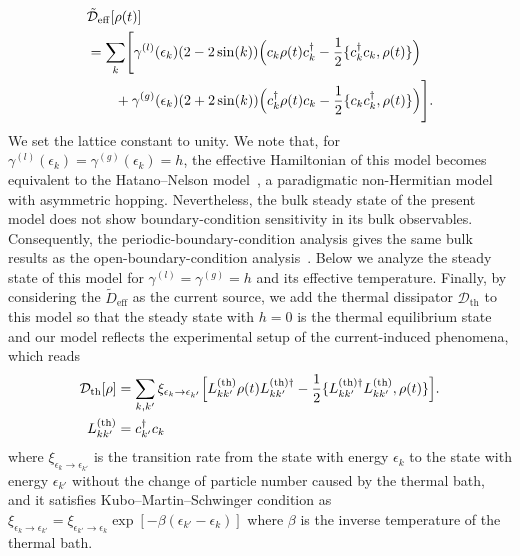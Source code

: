 \documentclass[a4paper, amsfonts, amssymb, amsmath, reprint, showkeys, nofootinbib, twoside,superscriptaddress, prl]{revtex4-2}
\newcommand{\m}[1]{\mathcal{#1}}
\newcommand{\mr}[1]{\mathrm{#1}}
\newcommand{\epk}{\epsilon_k}
\newcommand{\epkp}{\epsilon_{k'}}
\begin{document}
\begin{align}
&\tilde{\m{D}}_{\mr{eff}}[\rho(t)] \nonumber\\
&=\sum_k \Biggl[\gamma^{(l)}(\epsilon_k) (2-2\sin(k))\Bigl(c_k\rho(t)c_k^{\dagger} - \frac{1}{2}\{c_k^{\dagger}c_k, \rho(t)\}\Bigr)\nonumber\\
&\quad\quad +\gamma^{(g)}(\epsilon_k) (2+2\sin(k))\Bigl(c_k^{\dagger}\rho(t)c_k - \frac{1}{2}\{c_kc_k^{\dagger}, \rho(t)\}\Bigr)\Biggr].\label{jump_current2}
\end{align}
We set the lattice constant to unity. We note that, for $\gamma^{(l)}(\epsilon_k)=\gamma^{(g)}(\epsilon_k)=h$, the effective Hamiltonian of this model becomes equivalent to the Hatano--Nelson model~\cite{Hatano1998-jg,Hatano1996-sw}, a paradigmatic non-Hermitian model with asymmetric hopping. Nevertheless, the bulk steady state of the present model does not show boundary-condition sensitivity in its bulk observables. Consequently, the periodic-boundary-condition analysis gives the same bulk results as the open-boundary-condition analysis~\cite{Supple}.
Below we analyze the steady state of this model for $\gamma^{(l)} = \gamma^{(g)} = h$ and its effective temperature. 
Finally, by considering the $\tilde{D}_{\mr{eff}}$ as the current source, we add the thermal dissipator $\m{D}_{\mr{th}}$ to this model so that the steady state with $h=0$ is the thermal equilibrium state and our model reflects the experimental setup of the current-induced phenomena, which reads
\begin{align}
\m{D}_{\mr{th}}[\rho]& = \sum_{k, k'} \xi_{\epk\rightarrow\epkp}\Bigl[L^{(\mr{th})}_{kk'}\rho(t)L^{(\mr{th})\dagger}_{kk'} - \frac{1}{2}\{L^{(\mr{th})\dagger}_{kk'}L^{(\mr{th})}_{kk'}, \rho(t)\}\Bigr].\\
L^{(\mr{th})}_{kk'}& = c_{k'}^{\dagger} c_{k}\label{thermal_jump}
\end{align}
where $\xi_{\epk\rightarrow\epkp}$ is the transition rate from the state with energy $\epk$ to the state with energy $\epkp$ without the change of particle number caused by the thermal bath, and it satisfies Kubo--Martin--Schwinger condition as $\xi_{\epk\rightarrow\epkp} = \xi_{\epkp\rightarrow\epk} \exp[-\beta(\epkp-\epk)]$ where $\beta$ is the inverse temperature of the thermal bath.
\end{document}
